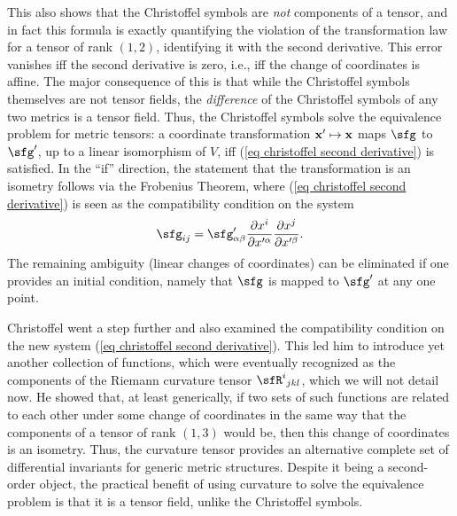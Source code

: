 \begin{rem}
    This also shows that the Christoffel symbols are \emph{not} components of a tensor, and in fact this formula is exactly quantifying the violation of the transformation law for a tensor of rank $(1,2)$, identifying it with the second derivative. This error vanishes iff the second derivative is zero, i.e., iff the change of coordinates is affine. The major consequence of this is that while the Christoffel symbols themselves are not tensor fields, the \emph{difference} of the Christoffel symbols of any two metrics is a tensor field. Thus, the Christoffel symbols solve the equivalence problem for metric tensors: a coordinate transformation $\bf{x}'\mapsto \bf{x}$ maps $\sfg$ to $\sfg'$, up to a linear isomorphism of $V$, iff (\ref{eq christoffel second derivative}) is satisfied. In the ``if'' direction, the statement that the transformation is an isometry follows via the Frobenius Theorem, where (\ref{eq christoffel second derivative}) is seen as the compatibility condition on the system 
    \[\sfg_{ij}=\sfg'_{\alpha\beta}\frac{\partial x^i}{\partial x^{\prime\alpha}}\frac{\partial x^j}{\partial x^{\prime\beta}}.\]
    The remaining ambiguity (linear changes of coordinates) can be eliminated if one provides an initial condition, namely that $\sfg$ is mapped to $\sfg'$ at any one point. 
    
    Christoffel went a step further and also examined the compatibility condition on the new system (\ref{eq christoffel second derivative}). This led him to introduce yet another collection of functions, which were eventually recognized as the components of the Riemann curvature tensor $\sfR^{i}{}_{jkl}$, which we will not detail now. He showed that, at least generically, if two sets of such functions are related to each other under some change of coordinates in the same way that the components of a tensor of rank $(1,3)$ would be, then this change of coordinates is an isometry. Thus, the curvature tensor provides an alternative complete set of differential invariants for generic metric structures. Despite it being a second-order object, the practical benefit of using curvature to solve the equivalence problem is that it is a tensor field, unlike the Christoffel symbols.
\end{rem}

